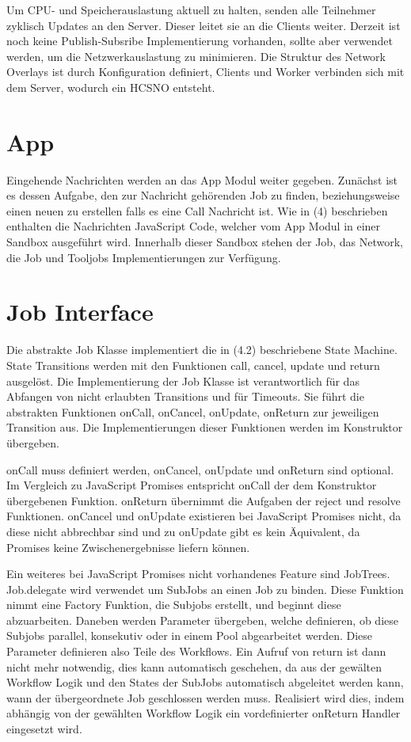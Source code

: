 Um CPU- und Speicherauslastung aktuell zu halten, senden alle Teilnehmer zyklisch Updates an den Server.
Dieser leitet sie an die Clients weiter.
Derzeit ist noch keine Publish-Subsribe Implementierung vorhanden, sollte aber verwendet werden, um die Netzwerkauslastung zu minimieren.
Die Struktur des Network Overlays ist durch Konfiguration definiert, Clients und Worker verbinden sich mit dem Server, wodurch ein HCSNO entsteht.




\section{App}
Eingehende Nachrichten werden an das App Modul weiter gegeben.
Zunächst ist es dessen Aufgabe, den zur Nachricht gehörenden Job zu finden, beziehungsweise einen neuen zu erstellen falls es eine Call Nachricht ist.
Wie in (4) beschrieben enthalten die Nachrichten JavaScript Code, welcher vom App Modul in einer Sandbox ausgeführt wird.
Innerhalb dieser Sandbox stehen der Job, das Network, die Job und Tooljobs Implementierungen zur Verfügung.




\section{Job Interface}
Die abstrakte Job Klasse implementiert die in (4.2) beschriebene State Machine.
State Transitions werden mit den Funktionen call, cancel, update und return ausgelöst.
Die Implementierung der Job Klasse ist verantwortlich für das Abfangen von nicht erlaubten Transitions und für Timeouts.
Sie führt die abstrakten Funktionen onCall, onCancel, onUpdate, onReturn zur jeweiligen Transition aus.
Die Implementierungen  dieser Funktionen werden im Konstruktor übergeben.

onCall muss definiert werden, onCancel, onUpdate und onReturn sind optional.
Im Vergleich zu JavaScript Promises entspricht onCall der dem Konstruktor übergebenen Funktion.
onReturn übernimmt die Aufgaben der reject und resolve Funktionen.
onCancel und onUpdate existieren bei JavaScript Promises nicht, da diese nicht abbrechbar sind und zu onUpdate gibt es kein Äquivalent, da Promises keine Zwischenergebnisse liefern können.

Ein weiteres bei JavaScript Promises nicht vorhandenes Feature sind JobTrees.
Job.delegate wird verwendet um SubJobs an einen Job zu binden.
Diese Funktion nimmt eine Factory Funktion, die Subjobs erstellt, und beginnt diese abzuarbeiten.
Daneben werden Parameter übergeben, welche definieren, ob diese Subjobs parallel, konsekutiv oder in einem Pool abgearbeitet werden.
Diese Parameter definieren also Teile des Workflows.
Ein Aufruf von return ist dann nicht mehr notwendig, dies kann automatisch geschehen, da aus der gewälten Workflow Logik und den States der SubJobs automatisch abgeleitet werden kann, wann der übergeordnete Job geschlossen werden muss.
Realisiert wird dies, indem abhängig von der gewählten Workflow Logik ein vordefinierter onReturn Handler eingesetzt wird.




